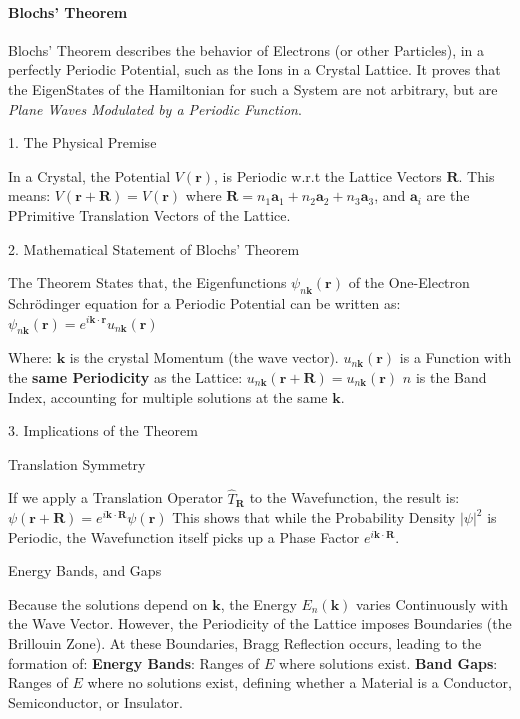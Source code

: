 \documentclass[a4paper, 10pt, onepage]{elegantbook}
\begin{document}
{\paragraph{Blochs' Theorem}

\noindent

Blochs' Theorem describes the behavior of Electrons (or other Particles), in a perfectly Periodic Potential, such as 
the Ions in a Crystal Lattice. It proves that the EigenStates of the Hamiltonian for such a System are not arbitrary, 
but are \emph{Plane Waves Modulated by a Periodic Function}.  

    1. The Physical Premise  

In a Crystal, the Potential $V(\mathbf{r})$, is Periodic w.r.t the Lattice Vectors $\mathbf{R}$. This means:  
$ V(\mathbf{r} + \mathbf{R}) = V(\mathbf{r}) $
where $\mathbf{R} = n_1 \mathbf{a}_1 + n_2 \mathbf{a}_2 + n_3 \mathbf{a}_3$, and $\mathbf{a}_i$ are the PPrimitive 
Translation Vectors of the Lattice.  

    2. Mathematical Statement of Blochs' Theorem  

The Theorem States that, the Eigenfunctions $\psi_{n\mathbf{k}}(\mathbf{r})$ of the One-Electron Schr\"odinger 
equation for a Periodic Potential can be written as:
$\psi_{n\mathbf{k}}(\mathbf{r}) = e^{i\mathbf{k} \cdot \mathbf{r}} u_{n\mathbf{k}}(\mathbf{r}) $

Where:  
 $\mathbf{k}$ is the crystal Momentum (the wave vector).  
 $u_{n\mathbf{k}}(\mathbf{r})$ is a Function with the \textbf{same Periodicity} as the Lattice:  
 $u_{n\mathbf{k}}(\mathbf{r} + \mathbf{R}) = u_{n\mathbf{k}}(\mathbf{r})$  
 $n$ is the Band Index, accounting for multiple solutions at the same $\mathbf{k}$.  

    3. Implications of the Theorem  

     Translation Symmetry  

If we apply a Translation Operator $\hat{T}_{\mathbf{R}}$ to the Wavefunction, the result is:  
$\psi(\mathbf{r} + \mathbf{R}) = e^{i\mathbf{k} \cdot \mathbf{R}} \psi(\mathbf{r})$  
This shows that while the Probability Density $|\psi|^2$ is Periodic, the Wavefunction itself picks up a Phase Factor 
$e^{i\mathbf{k} \cdot \mathbf{R}}$.  

     Energy Bands, and Gaps  

Because the solutions depend on $\mathbf{k}$, the Energy $E_n(\mathbf{k})$ varies Continuously with the Wave Vector. 
However, the Periodicity of the Lattice imposes Boundaries (the Brillouin Zone). At these Boundaries, Bragg Reflection 
occurs, leading to the formation of:  
  \textbf{Energy Bands}: Ranges of $E$ where solutions exist.
  \textbf{Band Gaps}: Ranges of $E$ where no solutions exist, defining whether a Material is a Conductor, 
Semiconductor, or Insulator.  

}
\end{document}
